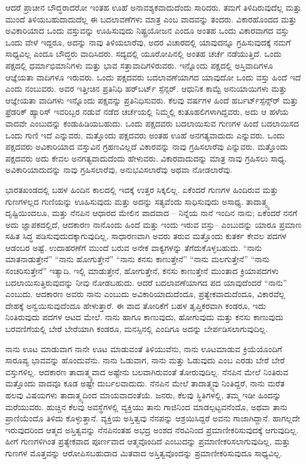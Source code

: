 ಆದರೆ ಪ್ರಾಚೀನ ಬೌದ್ಧರಾದರೋ ಇಂತಹ ಊಹೆ ಅನಾವಶ್ಯಕವಾದುದೆಂದು ಸಾರಿದರು. ತಮಗೆ ತಿಳಿದಿರುವುದೆಲ್ಲ ಮತ್ತು ಮುಂದೆ ತಿಳಿಯಬಹುದಾದುದೆಲ್ಲ ಈ ಬದಲಾವಣೆಗಳು ಮಾತ್ರ ಎಂಬ ವಾದವನ್ನು ತಂದರು. ವಿಕಾರಹೊಂದದ ಮತ್ತು ಅವಿಕಾರಿಯಾದ ಒಂದು ವಸ್ತುವನ್ನು ಊಹಿಸುವುದು ನಿಷ್ಟ್ರಯೋಜನ ಎಂದೂ ಅಂತಹ ಒಂದು ವಿಕಾರವಾಗದ ವಸ್ತು ಒಂದು ವೇಳೆ ಇದ್ದರೂ, ಅದನ್ನು ನಾವು ತಿಳಿಯಲಾರೆವು, ಅದರ ವಿಚಾರದಲ್ಲಿ ಯಾವುದನ್ನೂ ಗ್ರಹಿಸುವುದಕ್ಕೆ ನಮಗೆ ಸಾಧ್ಯವಿಲ್ಲ ಎಂದೂ ಬೌದ್ಧರು ವಾದಿಸಿದರು. ಸದ್ಯದಲ್ಲಿ ಯೂರೋಪಿನಲ್ಲಿ ಅಂತಹ ಚರ್ಚೆ ನಡೆಯುತ್ತಿದೆ. ಒಂದು ಪಕ್ಷದಲ್ಲಿ ಧರ್ಮಾಭಿಮಾನಿಗಳು ಮತ್ತು ಭಾವ ಸತ್ತಾವಾದಿಗಳಿರುವರು. ಇನ್ನೊಂದು ಪಕ್ಷದಲ್ಲಿ ಅಸ್ತಿವಾದಿಗಳೂ ಆಜ್ಞೆಯತಾ ವಾದಿಗಳೂ ಇರುವರು. ಒಂದು ಪಕ್ಷದವರು ಬದಲಾವಣೆಯಾಗದ ಯಾವುದೋ ಒಂದು ವಸ್ತು ಹಿಂದೆ ಇದೆ ಎಂದು ನಂಬುವರು. ಅವರ ಇತ್ತೀಚಿನ ಪ್ರತಿನಿಧಿ ಹರ್​ಬರ್ಟ್​ ಸ್ಪೆನ್ಸರ್​. ಆಧುನಿಕ ಕಾಮ್ಟೆ ಅನುಯಾಯಿಗಳು ಮತ್ತು ಆಜ್ಞೇಯತಾ ವಾದಿಗಳು ಇನ್ನೊಂದು ಪಕ್ಷವನ್ನು ಪ್ರತಿನಿಧಿಸುವರು. ಕೆಲವು ವರ್ಷಗಳ ಹಿಂದೆ ಹರ್ಬರ್ಟ್​ ಸ್ಪೆನ್ಸ್​ರ್​ ಮತ್ತು ಫ್ರೆಡರಿಕ್​ ಹ್ಯಾರಿಸ್​ ಇವರಿಬ್ಬರ ನಡುವೆ ನಡೆದ ಚರ್ಚೆಯಲ್ಲಿ ನಿಮ್ಮಲ್ಲಿ ಕುತೂಹಲಿಗಳಾಗಿದ್ದವರು, ಅದು ಆ ಹಳೆಯ ವಾದವೇ ಎಂಬುದನ್ನು ಕಂಡುಹಿಡಿಯಬಹುದು. ಒಂದು ಪಕ್ಷದವರು ಬದಲಾಯಿಸುವ ಗುಣಗಳ ಹಿಂದೆ ಬದಲಾಯಿಸದ ಒಂದು ಗುಣಿ ಇದೆ ಎನ್ನುವರು. ಮತ್ತೊಂದು ಪಕ್ಷದವರು ಅಂತಹ ಊಹೆ ಅನಗತ್ಯವಾದುದು ಎನ್ನುವರು. ಒಂದು ಪಕ್ಷದವರು ಅವಿಕಾರಿಯಾದ ವಸ್ತುವಿನ ಗ್ರಹಣವಿಲ್ಲದೆ ವಿಕಾರವನ್ನು ನಾವು ಗ್ರಹಿಸಲಾರೆವು ಎನ್ನುವರು. ಮತ್ತೊಂದು ಪಕ್ಷದವರು ಅದು ಕೇವಲ ಅನಗತ್ಯವಾದುದೆಂದು ಹೇಳುವರು. ವಿಕಾರವಾದುದನ್ನು ಮಾತ್ರ ನಾವು ಗ್ರಹಿಸಲು ಸಾಧ್ಯ. ಅವಿಕಾರಿಯಾದುದನ್ನು ನಾವು ಗ್ರಹಿಸಲಾರೆವು, ಅನುಭವಿಸಲಾರೆವು ಅಥವಾ ನೋಡಲಾರೆವು. 

ಭಾರತಖಂಡದಲ್ಲಿ ಬಹಳ ಹಿಂದಿನ ಕಾಲದಲ್ಲಿ ಇದಕ್ಕೆ ಉತ್ತರ ಸಿಕ್ಕಲಿಲ್ಲ. ಏಕೆಂದರೆ ಗುಣಗಳ ಹಿಂದಿರುವ ಮತ್ತು ಗುಣಗಳಲ್ಲದ ಗುಣಿಯನ್ನು ಊಹಿಸುವುದು ಮತ್ತು ಅದನ್ನು ಸತ್ಯವೆಂದು ಸಾಧಿಸುವುದು ಅಸಾಧ್ಯ. ತಾದಾತ್ಮ್ಯ ದೃಷ್ಟಿಯಿಂದಲೂ, ಮತ್ತು ನೆನಪಿನ ಆಧಾರದ ಮೇಲಿನ ವಾದವಾದ – ನಿನ್ನೆಯ ನಾನೆ ಇಂದಿನ ನಾನು; ಏಕೆಂದರೆ ನನಗೆ ಅದು ಜ್ಞಾಪಕದಲ್ಲಿದೆ, ಆದಕಾರಣ ನಾನೊಂದು ಹಿಂದೆ ಮತ್ತು ಇಂದು ಇರುವ ವಸ್ತು– ಎಂಬುದನ್ನು ಯಾರೂ ಪ್ರಮಾಣ ಸಹಿತ ಸಿದ್ಧ ಪಡಿಸುವುದುದಕ್ಕಾಗುವುದಿಲ್ಲ. ಸಾಧಾರಣವಾಗಿ ಅವರು ತರುವ ಮತ್ತೊಂದು ಕುತರ್ಕ ಕೇವಲ ಪದಗಳ ಆಡಂಬರ ಅಷ್ಟೆ. ಉದಾಹರಣೆಗೆ ಮುಂದೆ ಬರುವ ಅನೇಕ ವಾಕ್ಯಗಳನ್ನು ತೆಗೆದುಕೊಳ್ಳಬಹುದು. “ನಾನು ಮಾತನಾಡುತ್ತೇನೆ” “ನಾನು ಹೋಗುತ್ತೇನೆ” “ನಾನು ಕನಸು ಕಾಣುತ್ತೇನೆ” “ನಾನು ಮಲಗುತ್ತೇನೆ” “ನಾನು ಸಂಚರಿಸುತ್ತೇನೆ” ಇತ್ಯಾದಿ. ಇಲ್ಲಿ ಮಾಡುತ್ತೇನೆ, ಹೋಗುತ್ತೇನೆ, ಕನಸು ಕಾಣುತ್ತೇನೆ ಮುಂತಾದ ಕ್ರಿಯಾಪದಗಳು ಬದಲಾಯಿಸುತ್ತಿರುವುದನ್ನು ನೀವು ನೋಡಬಹುದು. ಆದರೆ ಬದಲಾವಣೆಯಾಗದ ಪದ ಯಾವುದೆಂದರೆ “ನಾನು” ಎಂಬುದು. ಆದಕಾರಣ ಅವರು ನಾನು ಎಂಬುದು ಅವಿಕಾರಿಯಾದುದೆಂದೂ, ಪ್ರತ್ಯೇಕವಾದುದೆಂದೂ, ವಿಕಾರವೆಲ್ಲ ದೇಹಕ್ಕೆ ಅನ್ವಯಿಸುವುದೆಂದೂ ಹೇಳುತ್ತಾರೆ. ಈ ವಾದ ತೋರಿಕೆಗೆ ಬಹಳ ತೃಪ್ತಿಕರವಾಗಿ ಕಂಡರೂ, ಇದು ನಿಂತಿರುವುದು ಪದಗಳ ಆಟದ ಮೇಲೆ. ನಾನು ಹಾಗೂ ಕಾಣುವುದು, ಹೋಗುವುದು ಮತ್ತು ಕನಸು ಕಾಣುವುದು ಬರವಣಿಗೆಯಲ್ಲಿ ಬೇರೆ ಬೇರೆಯಾಗಿ ಕಂಡರೂ, ಮನಸ್ಸಿನಲ್ಲಿ ಎಂದಿಗೂ ಅದನ್ನು ಬೇರ್ಪಡಿಸಲಾಗುವುದಿಲ್ಲ. 

\vskip 0.2cm

ನಾನು ಊಟ ಮಾಡುವಾಗ ನಾನೇ ಊಟ ಮಾಡುವಂತೆ ತಿಳಿಯುವೆನು, ನಾನು ಊಟಮಾಡುವ ಕ್ರಿಯೆಯೊಂದಿಗೆ ಸಾರೂಪ್ಯ ಭಾವವನ್ನು ಹೊಂದುವೆನು. ನಾನು ಓಡುವಾಗ, ನಾನು ಮತ್ತು ಓಡುವುದು ಎಂಬ ಎರಡು ಬೇರೆ ಬೇರೆ ವಸ್ತುಗಳಿಲ್ಲ. ಆದಕಾರಣ ತಾದಾತ್ಮ್ಯವಾದ ಅಷ್ಟೇನು ಬಲವಾಗಿರುವಂತೆ ತೋರುವುದಿಲ್ಲ. ನೆನಪಿನ ಮೇಲೆ ನಿಂತಿರುವ ಮತ್ತೊಂದು ವಾದವೂ ಕೂಡ ಅಷ್ಟೇ ದುರ್ಬಲವಾದುದು. ನೆನಪಿನ ಮೇಲೆ ತಾದಾತ್ಮ್ಯವು ನಿಂತಿದ್ದರೆ, ನಾನು ಮರೆತ ಹಲವು ವಿಷಯಗಳು ತಾದಾತ್ಮ್ಯದಿಂದ ಮಾಯವಾದಂತೆಯೆ. ಜನರು, ಕೆಲವು ಸ್ಥಿತಿಗಳಲ್ಲಿ, ತಮ್ಮ ಇಡೀ ಹಿಂದನ್ನು ಮರೆಯುವರು. ಹುಚ್ಚಿನ ಕೆಲವು ಅವಸ್ಥೆಗಳಲ್ಲಿ ವ್ಯಕ್ತಿಯು ತಾನು ಗಾಜಿನಿಂದ ಮಾಡಲ್ಪಟ್ಟವನೆಂದೊ, ಅಥವಾ ತಾನು ಪ್ರಾಣಿಯೆಂದೊ ತಿಳಿದು ಕೊಳ್ಳುತ್ತಾನೆ. ವ್ಯಕ್ತಿಯ ಅಸ್ತಿತ್ವವು ನೆನಪನ್ನು ಆಶ್ರಯಿಸಿದ್ದರೆ ಅವನು ಗಾಜಾಗಿದ್ದಾನೆ. ಹಾಗಲ್ಲದೇ ಇರುವುದರಿಂದ ಆತ್ಮದ ಅಸ್ತಿತ್ವವನ್ನು ನೆನಪಿನಂತಹ ಅಭದ್ರ ಅಂಶದ ನೆರವಿನಿಂದ ಪ್ರಮಾಣೀಕರಿಸುವುದಕ್ಕೆ ಆಗುವುದಿಲ್ಲ. ಹೀಗೆ ಗುಣಗಳಿಗಿಂತ ಪ್ರತ್ಯೇಕವಾದ ಪೂರ್ಣವಾದ ಆತ್ಮವೊಂದಿದೆ ಎಂಬುದನ್ನು ಪ್ರಮಾಣೀಕರಿಸಲಾಗುವುದಿಲ್ಲ, ಮತ್ತು ಗುಣಗಳ ಮೊತ್ತವನ್ನು ಆರೋಪಿಸಬಹುದಾದ ಮಿತವಾದ ಅಸ್ತಿತ್ವವೊಂದನ್ನು ಪ್ರಮಾಣೀಕರಿಸುವುದೂ ಸಾಧ್ಯವಿಲ್ಲ. 

